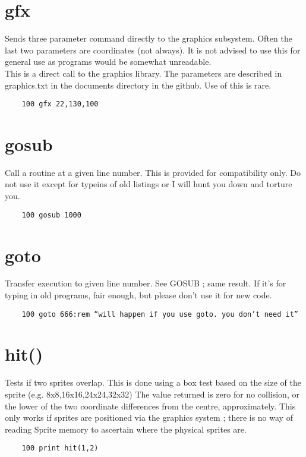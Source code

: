 \section*{gfx}
Sends three parameter command directly to the graphics subsystem. Often the last two parameters are coordinates (not always).  It is not advised to use this for general use as programs would be somewhat unreadable.\\
This is a direct call to the graphics library. The parameters are described in graphics.txt in the documents directory in the github. Use of this is rare.
\example{}
\begin{verbatim}
	100 gfx 22,130,100
\end{verbatim}

\section*{gosub}
Call a routine at a given line number. This is provided for compatibility only. Do not use it except for typeins of old listings or I will hunt you down and torture you.  
\example{}
\begin{verbatim}
	100 gosub 1000
\end{verbatim}

\section*{goto}
Transfer execution to given line number. See GOSUB ; same result. If it's for typing in old programs, fair enough, but please don't use it for new code.
\example{}
\begin{verbatim}
	100 goto 666:rem “will happen if you use goto. you don’t need it”
\end{verbatim}

\section*{hit()}
Tests if two sprites overlap. This is done using a box test based on the size of the sprite (e.g. 8x8,16x16,24x24,32x32)
The value returned is zero for no collision, or the lower of the two coordinate differences from the centre, approximately.
This only works if sprites are positioned via the graphics system ; there is no way of reading Sprite memory to ascertain where the physical sprites are.
\example{}
\begin{verbatim}
	100 print hit(1,2)
\end{verbatim}

